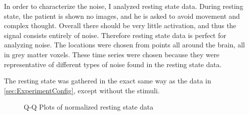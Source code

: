 In order to characterize the noise, I analyzed resting state data.
During resting state, the patient is shown no images, and he is asked
to avoid movement and complex thought.  Overall there should be
very little activation, and thus the signal consists entirely of noise.
Therefore resting state data is perfect for analyzing noise.
The locations were chosen from points all around the brain,
all in grey matter voxels. These time
series were chosen because they were representative of different types
of noise found in the resting state data.

The resting state was gathered in the exact same way as the data in
\autoref{sec:ExperimentConfig}, except without the stimuli.

\begin{figure}
\centering
{}


\caption{Q-Q Plots of normalized resting state data}
\label{fig:QQDC}
\end{figure}

